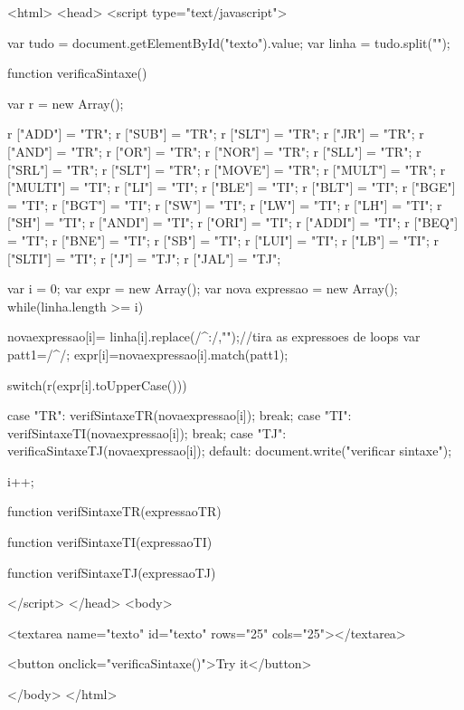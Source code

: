 <html>
<head>
<script type="text/javascript">
      
	var tudo = document.getElementById("texto").value;
	var linha = tudo.split("\n");
    
function verificaSintaxe(){

       	var r  = new Array();  

    r ["ADD"] = "TR";  
    r ["SUB"] = "TR";
    r ["SLT"] = "TR";
	r ["JR"] = "TR";
	r ["AND"] = "TR";
	r ["OR"] = "TR";
	r ["NOR"] = "TR";
	r ["SLL"] = "TR";
	r ["SRL"] = "TR";
	r ["SLT"] = "TR";
	r ["MOVE"] = "TR";
	r ["MULT"] = "TR";
	r ["MULTI"] = "TI";
	r ["LI"] = "TI";
	r ["BLE"] = "TI";
	r ["BLT"] = "TI";
	r ["BGE"] = "TI";
	r ["BGT"] = "TI";
	r ["SW"] = "TI";
	r ["LW"] = "TI";
	r ["LH"] = "TI";
	r ["SH"] = "TI";
	r ["ANDI"] = "TI";
	r ["ORI"] = "TI";
	r ["ADDI"] = "TI";
	r ["BEQ"] = "TI";
	r ["BNE"] = "TI";
	r ["SB"] = "TI";
	r ["LUI"] = "TI";
	r ["LB"] = "TI";
	r ["SLTI"] = "TI";
	r ["J"] = "TJ";
	r ["JAL"] = "TJ";
  
 	   var i = 0;
	   var expr = new Array();
	   var nova expressao = new Array();
	while(linha.length >= i){
	   
	     novaexpressao[i]= linha[i].replace(/^\w*\s*:/,"");//tira as expressoes de loops
         var patt1=/^\w*\s/;
         expr[i]=novaexpressao[i].match(patt1);
      
           switch(r(expr[i].toUpperCase())){
	     
		    case "TR":
		       verifSintaxeTR(novaexpressao[i]);
			   break;
		    case "TI":
              verifSintaxeTI(novaexpressao[i]);
              break;
            case "TJ":
              verificaSintaxeTJ(novaexpressao[i]);
            default:
              document.write("verificar sintaxe");
          }			  
		   
	   
	}
		 

     i++;	
    }
	
    function verifSintaxeTR(expressaoTR){
	
	}
	
	function verifSintaxeTI(expressaoTI){
	
	}
	
	function verifSintaxeTJ(expressaoTJ){
	
	}
    
</script>
</head>
<body>


<textarea name="texto" id="texto" rows="25" cols="25"></textarea>

<button onclick="verificaSintaxe()">Try it</button>


</body>
</html>